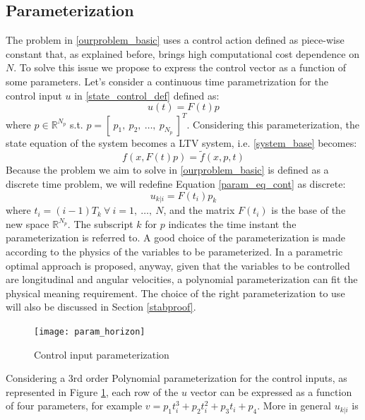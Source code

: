\subsection{Parameterization}
The problem in \ref{ourproblem_basic} uses a control action defined as piece-wise constant that, as explained before, brings high computational cost dependence on $N$. To solve this issue we propose to express the control vector as a function of some parameters.
Let's consider a continuous time parametrization for the control input $u$ in \ref{state_control_def} defined as:
\begin{equation}
{u}(t)=F(t)p
\label{param_eq_cont}
\end{equation}
where $p \in \mathbb{R}^{N_p}$ s.t. $p=[\ p_1,\ p_2,\ \dots,\ p_{N_p}\ ]^T$. Considering this parameterization, the state equation of the system becomes a LTV system, i.e. \ref{system_base} becomes:
\begin{equation}
	f(x,F(t)p)=\tilde{f}(x,p,t)
	\label{state_eq_par}
\end{equation}
Because the problem we aim to solve in \ref{ourproblem_basic} is defined as a discrete time problem, we will redefine Equation \ref{param_eq_cont} as discrete:
\begin{equation}\label{param_eq}
{u}_{k|i}=F(t_i)p_k
\end{equation}
where $t_i=(i-1)T_k\ \forall\ i=1,\ \dots,\  N$, and the matrix $F(t_i)$ is the base of the new space $\mathbb{R}^{N_p}$. The subscript $k$ for $p$ indicates the time instant the parameterization is referred to. A good choice of the parameterization is made according to the physics of the variables to be parameterized. In \cite{kelly2013mobile} a parametric optimal approach is proposed, anyway, given that the variables to be controlled are longitudinal and angular velocities, a polynomial parameterization can fit the physical meaning requirement. The choice of the right parameterization to use will also be discussed in Section \ref{stabproof}.
\begin{figure}[h!]
	\centering
	\texttt{[image: param\_horizon]}
	\caption{Control input parameterization}
	\label{param_horizon}
\end{figure}
Considering a 3rd order Polynomial parameterization for the control inputs, as represented in Figure \ref{param_horizon}, each row of the ${u}$ vector can be expressed as a function of four parameters, for example $v=p_1t_i^3+p_2t_i^2+p_3t_i+p_4$. More in general ${u}_{k|i}$ is
